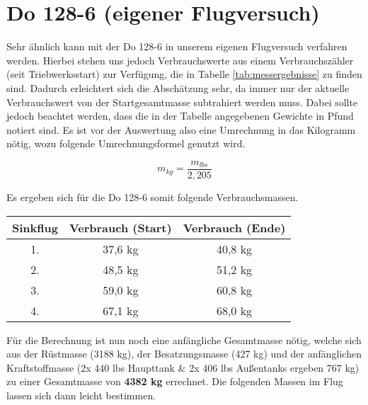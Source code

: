 \vspace{10mm}
\section{Do 128-6 (eigener Flugversuch)}
Sehr ähnlich kann mit der Do 128-6 in unserem eigenen Flugversuch verfahren werden. Hierbei stehen uns jedoch Verbrauchswerte aus einem Verbrauchszähler (seit Triebwerksstart) zur Verfügung, die in Tabelle \ref{tab:messergebnisse} zu finden sind. Dadurch erleichtert sich die Abschätzung sehr, da immer nur der aktuelle Verbrauchswert von der Startgesamtmasse subtrahiert werden muss. Dabei sollte jedoch beachtet werden, dass die in der Tabelle angegebenen Gewichte in Pfund notiert sind. Es ist vor der Auswertung also eine Umrechnung in das Kilogramm nötig, wozu folgende Umrechnungsformel genutzt wird.


\begin{equation}
m_{kg} = \frac{m_{lbs}}{2,205}
\end{equation}

\vspace{5mm}
Es ergeben sich für die Do 128-6 somit folgende Verbrauchsmassen.

\begin{table}[h]
	\centering
	\begin{tabular}{|c|c|c|}
		\hline
		\textbf{Sinkflug} & \textbf{Verbrauch (Start)} & \textbf{Verbrauch (Ende)} \\ \hline
		1. & 37,6 kg                                        & 40,8 kg                                       \\ \hline
		2. & 48,5 kg                                        & 51,2 kg                                       \\ \hline
		3. & 59,0 kg                                        & 60,8 kg                                       \\ \hline
		4. & 67,1 kg                                        & 68,0 kg                                       \\ \hline
	\end{tabular}
\end{table}

\vspace{10mm}
\noindent Für die Berechnung ist nun noch eine anfängliche Gesamtmasse nötig, welche sich aus der Rüstmasse (3188 kg), der Besatzungsmasse (427 kg) und der anfänglichen Kraftstoffmasse (2x 440 lbs Haupttank \& 2x 406 lbs Außentanks ergeben 767 kg) zu einer Gesamtmasse von \textbf{4382 kg} errechnet. Die folgenden Massen im Flug lassen sich dann leicht bestimmen.\\

